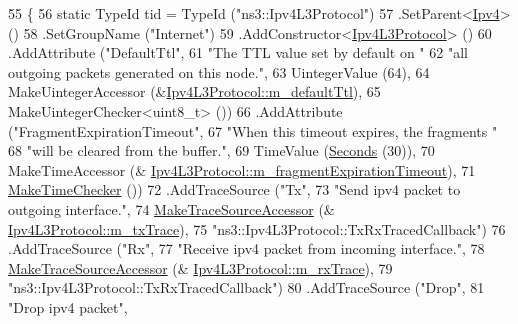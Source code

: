 \begin{DoxyCode}
55 \{
56   \textcolor{keyword}{static} TypeId tid = TypeId (\textcolor{stringliteral}{"ns3::Ipv4L3Protocol"})
57     .SetParent<\hyperlink{classns3_1_1Ipv4_a1c15284fe630c76e0c9c75a97f1ff234}{Ipv4}> ()
58     .SetGroupName (\textcolor{stringliteral}{"Internet"})
59     .AddConstructor<\hyperlink{classns3_1_1Ipv4L3Protocol_a994880814b636138a70977fa8fb51047}{Ipv4L3Protocol}> ()
60     .AddAttribute (\textcolor{stringliteral}{"DefaultTtl"},
61                    \textcolor{stringliteral}{"The TTL value set by default on "}
62                    \textcolor{stringliteral}{"all outgoing packets generated on this node."},
63                    UintegerValue (64),
64                    MakeUintegerAccessor (&\hyperlink{classns3_1_1Ipv4L3Protocol_aca3ce2700f8f7334464866ab2a76e427}{Ipv4L3Protocol::m\_defaultTtl}),
65                    MakeUintegerChecker<uint8\_t> ())
66     .AddAttribute (\textcolor{stringliteral}{"FragmentExpirationTimeout"},
67                    \textcolor{stringliteral}{"When this timeout expires, the fragments "}
68                    \textcolor{stringliteral}{"will be cleared from the buffer."},
69                    TimeValue (\hyperlink{group__timecivil_ga33c34b816f8ff6628e33d5c8e9713b9e}{Seconds} (30)),
70                    MakeTimeAccessor (&
      \hyperlink{classns3_1_1Ipv4L3Protocol_a6ad1c5e5d4bde4a903aadab94c6ec164}{Ipv4L3Protocol::m\_fragmentExpirationTimeout}),
71                    \hyperlink{group__time_ga7032965bd4afa578691d88c09e4481c1}{MakeTimeChecker} ())
72     .AddTraceSource (\textcolor{stringliteral}{"Tx"},
73                      \textcolor{stringliteral}{"Send ipv4 packet to outgoing interface."},
74                      \hyperlink{group__tracing_gab21a770b9855af4e8f69f7531ea4a6b0}{MakeTraceSourceAccessor} (&
      \hyperlink{classns3_1_1Ipv4L3Protocol_a91a19b062bd7e55da11615385e0e2788}{Ipv4L3Protocol::m\_txTrace}),
75                      \textcolor{stringliteral}{"ns3::Ipv4L3Protocol::TxRxTracedCallback"})
76     .AddTraceSource (\textcolor{stringliteral}{"Rx"},
77                      \textcolor{stringliteral}{"Receive ipv4 packet from incoming interface."},
78                      \hyperlink{group__tracing_gab21a770b9855af4e8f69f7531ea4a6b0}{MakeTraceSourceAccessor} (&
      \hyperlink{classns3_1_1Ipv4L3Protocol_a8a973a63eb239c315d630c9ff300823a}{Ipv4L3Protocol::m\_rxTrace}),
79                      \textcolor{stringliteral}{"ns3::Ipv4L3Protocol::TxRxTracedCallback"})
80     .AddTraceSource (\textcolor{stringliteral}{"Drop"},
81                      \textcolor{stringliteral}{"Drop ipv4 packet"},

\end{DoxyCode}
